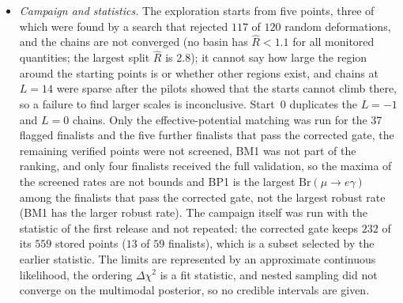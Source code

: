 \documentclass[twocolumn,epjc3]{svjour3}
\newcommand{\Br}{\mathrm{Br}}
\begin{document}
\begin{itemize}
\item \emph{Campaign and statistics.} The exploration starts from five points, three of which were found by a search that rejected $117$ of $120$ random deformations, and the chains are not converged (no basin has $\hat R<1.1$ for all monitored quantities; the largest split $\hat R$ is $2.8$); it cannot say how large the region around the starting points is or whether other regions exist, and chains at $L=14$ were sparse after the pilots showed that the starts cannot climb there, so a failure to find larger scales is inconclusive. Start~0 duplicates the $L=-1$ and $L=0$ chains. Only the effective-potential matching was run for the $37$ flagged finalists and the five further finalists that pass the corrected gate, the remaining verified points were not screened, BM1 was not part of the ranking, and only four finalists received the full validation, so the maxima of the screened rates are not bounds and BP1 is the largest $\Br(\mu\to e\gamma)$ among the finalists that pass the corrected gate, not the largest robust rate (BM1 has the larger robust rate). The campaign itself was run with the statistic of the first release and not repeated: the corrected gate keeps $232$ of its $559$ stored points ($13$ of $59$ finalists), which is a subset selected by the earlier statistic. The limits are represented by an approximate continuous likelihood, the ordering $\Delta\chi^2$ is a fit statistic, and nested sampling did not converge on the multimodal posterior, so no credible intervals are given.
\end{itemize}
\end{document}
